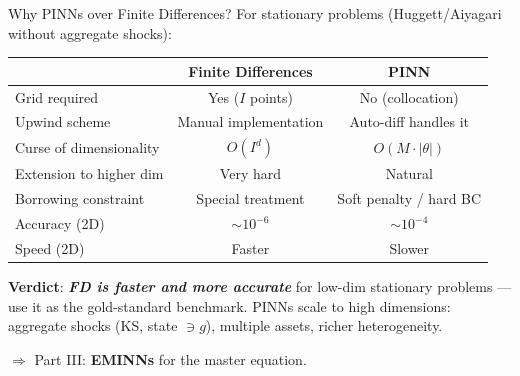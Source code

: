 \documentclass[aspectratio=169,11pt]{beamer}
\newcommand{\emphc}[1]{\textcolor{harvardcrimson}{#1}}
\begin{document}
\begin{frame}{Why PINNs over Finite Differences?}
\small
For stationary problems (Huggett/Aiyagari without aggregate shocks):

\vspace{0.1em}
\begin{center}
\footnotesize
\renewcommand{\arraystretch}{1.05}
\begin{tabular}{lcc}
\toprule
& \textbf{Finite Differences} & \textbf{PINN} \\
\midrule
Grid required & Yes ($I$ points) & \emphc{No} (collocation) \\
Upwind scheme & Manual implementation & Auto-diff handles it \\
Curse of dimensionality & $O(I^d)$ & $O(M \cdot |\theta|)$ \\
Extension to higher dim & Very hard & Natural \\
Borrowing constraint & Special treatment & Soft penalty / hard BC \\
Accuracy (2D) & $\sim 10^{-6}$ & $\sim 10^{-4}$ \\
Speed (2D) & Faster & Slower \\
\bottomrule
\end{tabular}
\end{center}

\vspace{0.1em}
\textbf{Verdict}: \textbf{\emph{FD is faster and more accurate}} for low-dim stationary problems --- use it as the gold-standard benchmark. PINNs \emphc{scale to high dimensions}: aggregate shocks (KS, state $\ni g$), multiple assets, richer heterogeneity.
\vspace{-0.2em}

$\Longrightarrow$ Part III: \textbf{EMINNs} for the master equation.
\end{frame}
\end{document}
